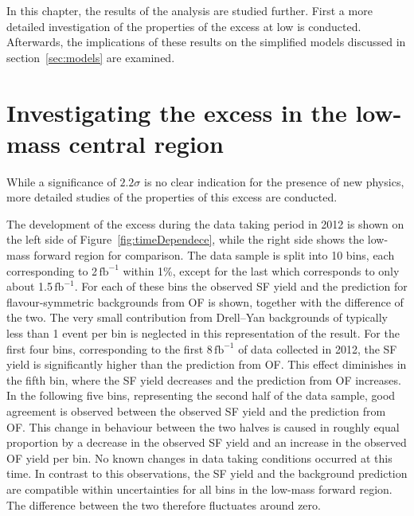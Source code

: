\label{sec:newInt}
In this chapter, the results of the analysis are studied further. First a more detailed investigation of the properties of the excess at low \mll is conducted. Afterwards, the implications of these results on the  simplified models discussed in section~\ref{sec:models} are examined.
\section{Investigating the excess in the low-mass central region}
While a significance of $2.2\sigma$ is no clear indication for the presence of new physics, more detailed studies of the properties of this excess are conducted. 

The development of the excess during the data taking period in 2012 is shown on the left side of Figure~\ref{fig:timeDependece}, while the right side shows the low-mass forward region for comparison. The data sample is split into 10 bins, each corresponding to 2\,$\mathrm{fb}^{-1}$ within 1\%, except for the last which corresponds to only  about 1.5\,$\mathrm{fb}^{-1}$. For each of these bins the observed SF yield and the prediction for flavour-symmetric backgrounds from OF is shown, together with the difference of the two. The very small contribution from Drell--Yan backgrounds of typically less than 1 event per bin is neglected in this representation of the result. For the first four bins, corresponding to the first 8\,$\mathrm{fb}^{-1}$ of data collected in 2012, the SF yield is significantly higher than the prediction from OF. This effect diminishes in the fifth bin, where the SF yield decreases and the prediction from OF increases. In the following five bins, representing the second half of the data sample, good agreement is observed between the observed SF yield and the prediction from OF. This change in behaviour between the two halves is caused in roughly equal proportion by a decrease in the observed SF yield and an increase in the observed OF yield per bin. No known changes in data taking conditions occurred at this time. In contrast to this observations, the SF yield and the background prediction are compatible within uncertainties for all bins in the low-mass forward region. The difference between the two therefore fluctuates around zero.

